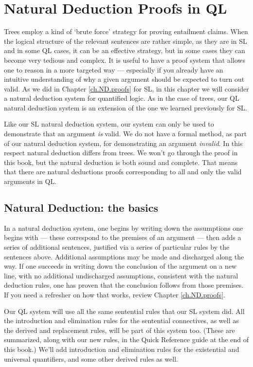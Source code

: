 \chapter{Natural Deduction Proofs in QL}
\label{ch.QLND}


Trees employ a kind of `brute force' strategy for proving entailment claims. When the logical structure of the relevant sentences are rather simple, as they are in SL and in some QL cases, it can be an effective strategy, but in some cases they can become very tedious and complex. It is useful to have a proof system that allows one to reason in a more targeted way --- especially if you already have an intuitive understanding of why a given argument should be expected to turn out valid. As we did in Chapter \ref{ch.ND.proofs} for SL, in this chapter we will consider a natural deduction system for quantified logic. As in the case of trees, our QL natural deduction system is an extension of the one we learned previously for SL.

Like our SL natural deduction system, our system can only be used to demonstrate that an argument \emph{is} valid. We do not have a formal method, as part of our natural deduction system, for demonstrating an argument \emph{invalid}. In this respect natural deduction differs from trees. We won't go through the proof in this book, but the natural deduction is both sound and complete. That means that there are natural deductions proofs corresponding to all and only the valid arguments in QL.

\section{Natural Deduction: the basics}

In a natural deduction system, one begins by writing down the assumptions one begins with --- these correspond to the premises of an argument --- then adds a series of additional sentences, justified via a series of particular rules by the sentences above. Additional assumptions may be made and discharged along the way. If one succeeds in writing down the conclusion of the argument on a new line, with no additional undischarged assumptions, consistent with the natural deduction rules, one has proven that the conclusion follows from those premises. If you need a refresher on how that works, review Chapter \ref{ch.ND.proofs}.

Our QL system will use all the same sentential rules that our SL system did. All the introduction and elimination rules for the sentential connectives, as well as the derived and replacement rules, will be part of this system too. (These are summarized, along with our new rules, in the Quick Reference guide at the end of this book.) We'll add introduction and elimination rules for the existential and universal quantifiers, and some other derived rules as well.


